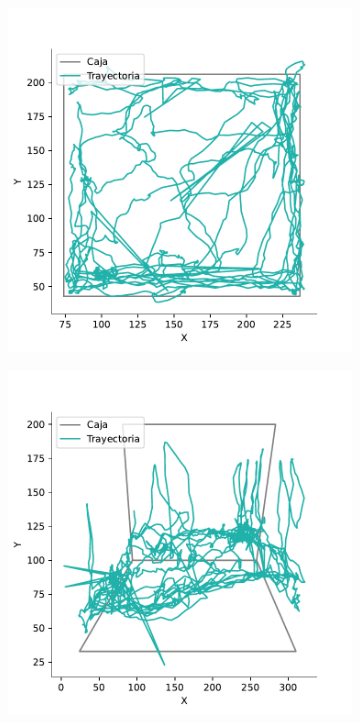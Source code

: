 \begin{figure}[p]
  \centering
  \begin{subfigure}{0.38\textwidth}
    \centering
    \includegraphics[width=\textwidth]{figures/raw-trayectory-top-4128-2020-12-02.pdf}
    \caption{}
    \label{fig:raw-top}
  \end{subfigure}
  \begin{subfigure}{0.38\textwidth}
    \centering
    \includegraphics[width=\textwidth]{figures/raw-trayectory-lateral-4128-2020-12-02.pdf}

\end{subfigure}
\end{figure}
